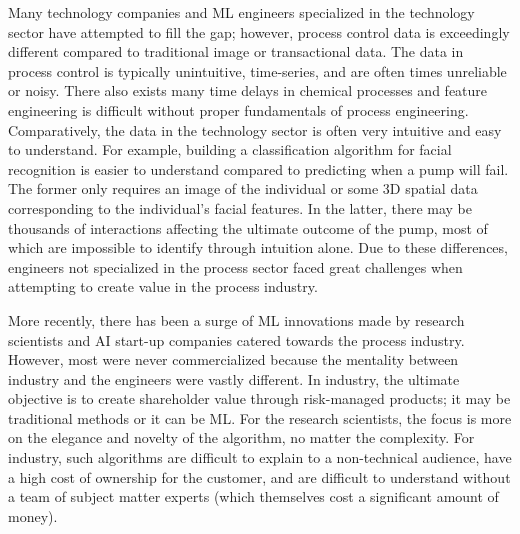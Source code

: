 Many technology companies and ML engineers specialized in the technology sector have attempted to fill the gap; however, process control data is exceedingly different compared to traditional image or transactional data.  The data in process control is typically unintuitive, time-series, and are often times unreliable or noisy.  There also exists many time delays in chemical processes and feature engineering is difficult without proper fundamentals of process engineering. Comparatively, the data in the technology sector is often very intuitive and easy to understand.  For example, building a classification algorithm for facial recognition is easier to understand compared to predicting when a pump will fail.  The former only requires an image of the individual or some 3D spatial data corresponding to the individual's facial features. In the latter, there may be thousands of interactions affecting the ultimate outcome of the pump, most of which are impossible to identify through intuition alone. Due to these differences, engineers not specialized in the process sector faced great challenges when attempting to create value in the process industry.

More recently, there has been a surge of ML innovations made by research scientists and AI start-up companies catered towards the process industry.  However, most were never commercialized because the mentality between industry and the engineers were vastly different.  In industry, the ultimate objective is to create shareholder value through risk-managed products; it may be traditional methods or it can be ML.  For the research scientists, the focus is more on the elegance and novelty of the algorithm, no matter the complexity. For industry, such algorithms are difficult to explain to a non-technical audience, have a high cost of ownership for the customer, and are difficult to understand without a team of subject matter experts (which themselves cost a significant amount of money).

